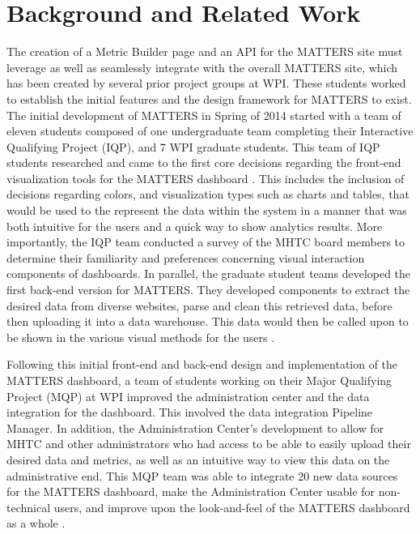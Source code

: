\chapter{Background and Related Work}

	The creation of a Metric Builder page and an API for the MATTERS site must 
	leverage as well as seamlessly integrate with the overall MATTERS site, 
	which has been created by several prior project groups at WPI. These 
	students worked to establish the initial features and the design framework 
	for MATTERS to exist. The initial development of MATTERS in Spring of 2014 
	started with a team of eleven students composed of one undergraduate team 
	completing their Interactive Qualifying Project (IQP), and 7 WPI graduate 
	students. This team of IQP students researched and came to the first core 
	decisions regarding the front-end visualization tools for the MATTERS 
	dashboard \cite{prevreport}. This includes the inclusion of decisions 
	regarding colors, and visualization types such as charts and tables, that 
	would be used to the represent the data within the system in a manner that 
	was both intuitive for the users and a quick way to show analytics results. 
	More importantly, the IQP team conducted a survey of the MHTC board members 
	to determine their familiarity and preferences concerning visual interaction 
	components of dashboards. In parallel, the graduate student teams developed 
	the first back-end version for MATTERS. They developed components to extract 
	the desired data from diverse websites, parse and clean this retrieved data, 
	before then uploading it into a data warehouse. This data would then be 
	called upon to be shown in the various visual methods for the users 
	\cite{iqp}.

	Following this initial front-end and back-end design and implementation of 
	the MATTERS dashboard, a team of students working on their Major Qualifying 
	Project (MQP) at WPI improved the administration center and the data 
	integration for the dashboard. This involved the data integration Pipeline 
	Manager. In addition, the Administration Center's development to allow for 
	MHTC and other administrators who had access to be able to easily upload 
	their desired data and metrics, as well as an intuitive way to view this 
	data on the administrative end. This MQP team was able to integrate 20 new 
	data sources for the MATTERS dashboard, make the Administration Center 
	usable for non-technical users, and improve upon the look-and-feel of the 
	MATTERS dashboard as a whole \cite{iqp}.

